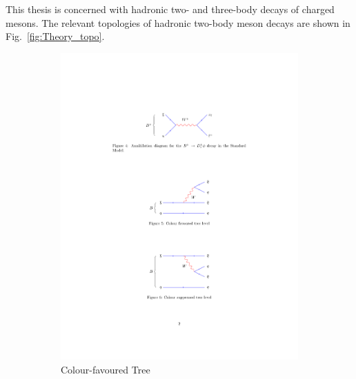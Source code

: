 This thesis is concerned with hadronic two- and three-body decays of charged \B mesons.
The relevant topologies of hadronic two-body \Bp meson decays are shown in Fig.~\ref{fig:Theory_topo}. 
\begin{figure}[!h]
    \centering
    \begin{subfigure}[b]{0.32\textwidth}
        \centering
        \includegraphics[width=1.0\textwidth]{figs/Theory/TreeFav.pdf}
        \caption{Colour-favoured Tree}
        \label{fig:theory_colour_fav}
    \end{subfigure}
    \begin{subfigure}[b]{0.32\textwidth}
        \centering

\end{subfigure}
\end{figure}
